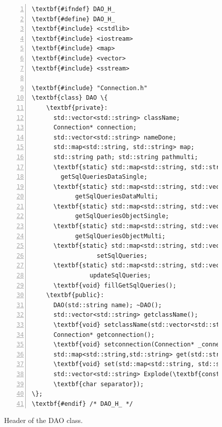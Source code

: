 \begin{figure}[t!h!]
\begin{minipage}{.5\paperwidth}
\begin{mylisting}
\begin{Verbatim}[commandchars=\\\{\},fontsize=\scriptsize, numbers=left, numbersep=2pt]
\textbf{#ifndef} DAO_H_
\textbf{#define} DAO_H_
\textbf{#include} <cstdlib>
\textbf{#include} <iostream>
\textbf{#include} <map>
\textbf{#include} <vector>
\textbf{#include} <sstream>

\textbf{#include} "Connection.h"
\textbf{class} DAO \{
    \textbf{private}:
      std::vector<std::string> className;
      Connection* connection;
      std::vector<std::string> nameDone;
      std::map<std::string, std::string> map;
      std::string path; std::string pathmulti;
      \textbf{static} std::map<std::string, std::string>
        getSqlQueriesDataSingle;
      \textbf{static} std::map<std::string, std::vector<std::string>>
			getSqlQueriesDataMulti;
      \textbf{static} std::map<std::string, std::vector<std::string>>
			getSqlQueriesObjectSingle;
      \textbf{static} std::map<std::string, std::vector<std::string>>
			getSqlQueriesObjectMulti;
      \textbf{static} std::map<std::string, std::vector<std::string>>
				  setSqlQueries;
      \textbf{static} std::map<std::string, std::vector<std::string>>
				updateSqlQueries;
      \textbf{void} fillGetSqlQueries();
    \textbf{public}:
      DAO(std::string name); ~DAO();
      std::vector<std::string> getclassName();
      \textbf{void} setclassName(std::vector<std::string> _className);
      Connection* getconnection();
      \textbf{void} setconnection(Connection* _connection);
      std::map<std::string,std::string> get(std::string name);
      \textbf{void} set(std::map<std::string, std::string> data);
      std::vector<std::string> Explode(\textbf{const} std::string & str,
      \textbf{char separator});
\};
\textbf{#endif} /* DAO_H_ */
\end{Verbatim}
\end{mylisting}
\end{minipage}
\caption{Header of the DAO class.}
\label{fig:headerdao}
\end{figure}


